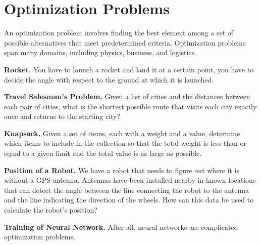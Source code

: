 \chapter{Optimization Problems}
\label{sec:op}

An optimization problem involves finding the best element among a set of possible alternatives that meet predetermined criteria.
Optimization problems span many domains, including physics, business, and logistics.

\textbf{Rocket.} You have to launch a rocket and land it at a certain point, you have to decide the angle with respect to the ground at which it is launched.


\textbf{Travel Salesman's Problem.} Given a list of cities and the distances between each pair of cities, what is the shortest possible route that visits each city exactly once and returns to the starting city?


\textbf{Knapsack.} Given a set of items, each with a weight and a value, determine which items to include in the collection so that the total weight is less than or equal to a given limit and the total value is as large as possible.

\textbf{Position of a Robot.} We have a robot that needs to figure out where it is without a GPS antenna. Antennas have been installed nearby in known locations that can detect the angle between the line connecting the robot to the antenna and the line indicating the direction of the wheels. How can this data be used to calculate the robot's position?

\textbf{Training of Neural Network.} After all, neural networks are complicated optimization problems.

